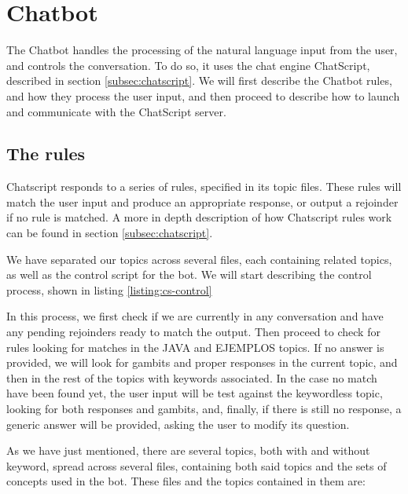 \section{Chatbot}
\label{sec:chatbot}

The Chatbot handles the processing of the natural language input from the user, and controls the conversation. To do so, it uses the chat engine ChatScript, described in section \ref{subsec:chatscript}. We will first describe the Chatbot rules, and how they process the user input, and then proceed to describe how to launch and communicate with the ChatScript server.

\subsection{The rules}

Chatscript responds to a series of rules, specified in its topic files. These rules will match the user input and produce an appropriate response, or output a rejoinder if no rule is matched. A more in depth description of how Chatscript rules work can be found in section \ref{subsec:chatscript}.

We have separated our topics across several files, each containing related topics, as well as the control script for the bot. We will start describing the control process, shown in listing \ref{listing:cs-control}

\begin{center}
  
\end{center}

In this process, we first check if we are currently in any conversation and have any pending rejoinders ready to match the output. Then proceed to check for rules looking for matches in the JAVA and EJEMPLOS topics. If no answer is provided, we will look for gambits and proper responses in the current topic, and then in the rest of the topics with keywords associated. In the case no match have been found yet, the user input will be test against the keywordless topic, looking for both responses and gambits, and, finally, if there is still no response, a generic answer will be provided, asking the user to modify its question.

As we have just mentioned, there are several topics, both with and without keyword, spread across several files, containing both said topics and the sets of concepts used in the bot. These files and the topics contained in them are:


